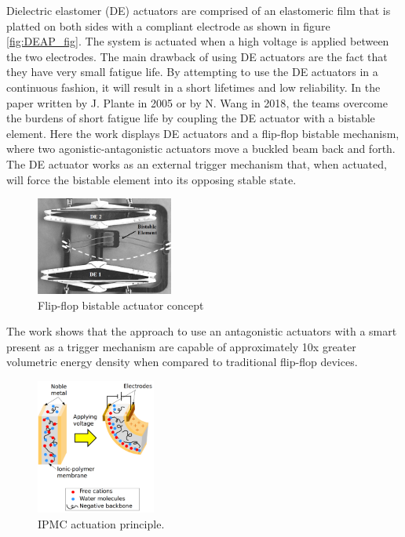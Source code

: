 Dielectric elastomer (DE) actuators are comprised of an elastomeric film that is platted on both sides with a compliant electrode as shown in figure \ref{fig:DEAP_fig}. The system is actuated when a high voltage is applied between the two electrodes. The main drawback of using DE actuators are the fact that they have very small fatigue life. By attempting to use the DE actuators in a continuous fashion, it will result in a short lifetimes and low reliability. In the paper written by J. Plante in 2005\cite{plante_properties_2007,chouinard_bistable_2012} or by N. Wang in 2018\cite{wang_design_2018}, the teams overcome the burdens of short fatigue life by coupling the DE actuator with a bistable element. Here the work displays DE actuators and a flip-flop bistable mechanism, where two agonistic-antagonistic actuators move a buckled beam back and forth. The DE actuator works as an external trigger mechanism that, when actuated, will force the bistable element into its opposing stable state.
\begin{figure}[H]
	\centering
	\includegraphics[width=0.4\textwidth]{Figures/DEAP_flipflop.png}
	\caption{Flip-flop bistable actuator concept\cite{plante_compliant_2005}}
	\label{fig:DEAP_flipflop}
\end{figure}

The work shows that the approach to use an antagonistic actuators with a smart present as a trigger mechanism are capable of approximately 10x greater volumetric energy density when compared to traditional flip-flop devices.\\

\begin{figure}
	\centering
	\vspace{-20pt}
	\includegraphics[width=0.35\textwidth]{Figures/IPMC_fig.png}
	\caption{IPMC actuation principle\cite{poubel_proposal_2011}.}
	\vspace{-15pt}
	\label{fig:IPMC_act}
\end{figure}

